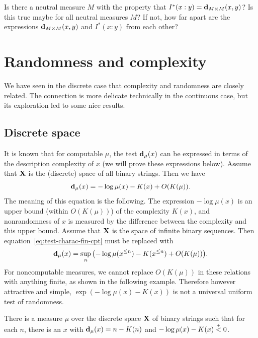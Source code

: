  \begin{question} 
Is there a neutral measure $M$ with the property that
$I^{*}(x:y) = \mathbf{d}_{M\times M}(x,y)$?
Is this true maybe for all neutral measures $M$?
If not, how far apart are the expressions $\mathbf{d}_{M\times M}(x,y)$ and
$I^{*}(x:y)$ from each other?
 \end{question}


  \section{Randomness and complexity}

We have seen in the discrete case that complexity and randomness are
closely related.
The connection is more delicate technically in the continuous case, but its
exploration led to some nice results.

\subsection{Discrete space}
It is known that for computable \( \mu \), the test \( \mathbf{d}_{\mu}(x) \) can be
expressed in terms of the description complexity of \( x \)
(we will prove these expressions below).
Assume that \( \mathbf{X} \) is the (discrete) space of all binary strings.
Then we have 
\begin{equation}\label{eq:test-charac-fin-cpt}
   \mathbf{d}_{\mu}(x) = -\log \mu(x) - K(x) + O(K(\mu)).
\end{equation}
The meaning of this equation is the following.  
The expression
\( -\log\mu(x) \) is an upper bound (within \( O(K(\mu)) \)) of the complexity
\( K(x) \), and nonrandomness of \( x \) is measured by
the difference between the complexity and this upper bound.
Assume that \( \mathbf{X} \) is the space of infinite binary sequences.
Then equation~\eqref{eq:test-charac-fin-cpt} must be replaced with
\begin{equation}\label{eq:test-charac-infin-cpt}
   \mathbf{d}_{\mu}(x) = 
 \sup_{n}{\left( -\log \mu(x^{\le n}) - K(x^{\le n}) + O(K(\mu))\right)}.
\end{equation}
For noncomputable measures, we cannot replace \( O(K(\mu)) \) in
these relations with anything finite, as shown in
the following example.
Therefore however attractive and simple, 
\( \exp(-\log \mu(x) - K(x)) \) is not a universal uniform test of randomness. 

 \begin{proposition}\label{propo:test-charac-counterexample}
There is a measure \( \mu \) over the discrete space \( \mathbf{X} \) of binary strings
such that for each \( n \), there is an \( x \) with
\( \mathbf{d}_{\mu}(x) = n - K(n) \) and \( -\log \mu(x) - K(x) \stackrel{{}_+}{<} 0 \).
 \end{proposition}

